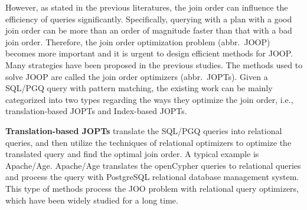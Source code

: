 \documentclass[sigconf, nonacm]{acmart}
\begin{document}
However, as stated in the previous literatures, the join order can influence the efficiency of queries significantly.
Specifically, querying with a plan with a good join order can be more than an order of magnitude faster than that with a bad join order.
Therefore, the join order optimization problem (abbr.~JOOP) becomes more important and it is urgent to design efficient methods for JOOP.
Many strategies have been proposed in the previous studies. 
The methods used to solve JOOP are called the join order optimizers (abbr.~JOPTs).
Given a SQL/PGQ query with pattern matching, the existing work can be mainly categorized into two types regarding the ways they optimize the join order, i.e., translation-based JOPTs and Index-based JOPTs.


\textbf{Translation-based JOPTs} translate the SQL/PGQ queries into relational queries, and then utilize the techniques of relational optimizers to optimize the translated query and find the optimal join order. 
A typical example is Apache/Age. 
Apache/Age translates the openCypher queries to relational queries and process the query with PostgreSQL relational database management system.
This type of methods process the JOO problem with relational query optimizers, which have been widely studied for a long time.
\end{document}
